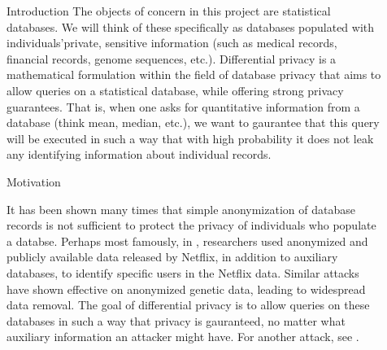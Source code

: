 \documentclass[final]{beamer}
\newlength{\sepwid}
\newlength{\onecolwid}
\newlength{\twocolwid}
\begin{document}
\begin{frame}[t]
\begin{columns}[t]
\begin{column}{\onecolwid}
\begin{block}{Introduction}
The objects of concern in this project are statistical databases. We will think of these specifically as databases populated with individuals'private, sensitive information (such as medical records, financial records, genome sequences, etc.). Differential privacy is a mathematical formulation within the field of database privacy that aims to allow queries on a statistical database, while offering strong privacy guarantees. That is, when one asks for quantitative information from a database (think mean, median, etc.), we want to gaurantee that this query will be executed in such a way that with high probability it does not leak any identifying information about individual records.

\end{block}

\begin{block}{Motivation}

It has been shown many times that simple anonymization of database records is not sufficient to protect the privacy of individuals who populate a databse. Perhaps most famously, in \cite{narayanan2008robust}, researchers used anonymized and publicly available data released by Netflix, in addition to auxiliary databases, to identify specific users in the Netflix data. Similar attacks have shown effective on anonymized genetic data, leading to widespread data removal. The goal of differential privacy is to allow queries on these databases in such a way that privacy is gauranteed, no matter what auxiliary information an attacker might have. For another attack, see \cite{homer2008resolving}.

\end{block}



\end{column} %

\begin{column}{\sepwid}\end{column} %

\begin{column}{\twocolwid} %

\begin{columns}[t,totalwidth=\twocolwid] %

\begin{column}{\onecolwid}\vspace{-.6in} %


\end{column}
\end{columns}
\end{column}
\end{columns}
\end{frame}
\end{document}
